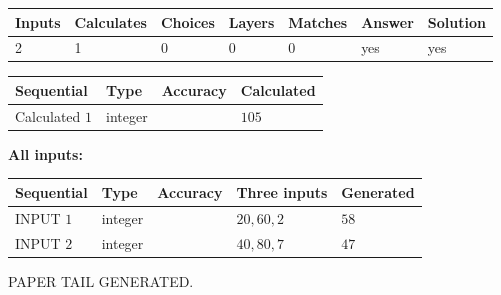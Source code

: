 \documentclass[12pt]{article}
\begin{document}
 
\noindent{}
 
 

 
   
   
   
   
\noindent\begin{tabular}{|l|l|l|l|l|l|l|}
 \hline
Inputs & Calculates & Choices & Layers & Matches & Answer & Solution \\ \hline
 2  & 
 1  & 
 0
  & 
 0  & 
 0  & 
  yes & 
  yes 
  \\ \hline
 \end{tabular}
   
   
   
   
\noindent{}
   
   
  
  
\noindent\begin{tabular}{|l|l|l|l|}
\hline
 Sequential & Type & Accuracy & Calculated \\ 
\hline
 
 
  Calculated $  1 $ & integer &  & 
  $ 105 $ 
 \\  \hline  
 \end{tabular}
   
   
   
   
\noindent\vspace{0.1in}\hspace{-0.08in} {\textbf{\Large{All inputs: }}}
   
   
  
  
\noindent\begin{tabular}{|l|l|l|l|l|}
\hline
 Sequential & Type & Accuracy & Three inputs & Generated \\ 
\hline
 
 
  INPUT $  1 $ & integer &  & $
 20
 , 
 60
 , 
 2
 $ & $ 58 $ 
 \\  \hline  
 
 
  INPUT $  2 $ & integer &  & $
 40
 , 
 80
 , 
 7
 $ & $ 47 $ 
 \\  \hline  
 \end{tabular}
   
   
   
   
   
   
 \vspace{0.2in}
 
   
   
\vspace{2.0in} PAPER TAIL GENERATED.
   
\end{document}
